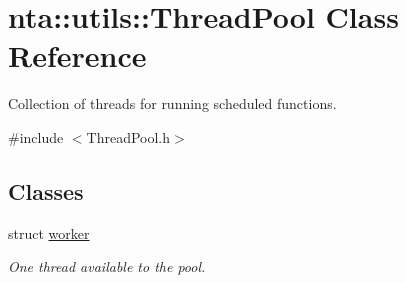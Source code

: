 \hypertarget{classnta_1_1utils_1_1ThreadPool}{}\section{nta\+:\+:utils\+:\+:Thread\+Pool Class Reference}
\label{classnta_1_1utils_1_1ThreadPool}


Collection of threads for running scheduled functions.  




{\ttfamily \#include $<$Thread\+Pool.\+h$>$}

\subsection*{Classes}
\begin{DoxyCompactItemize}
\item 
struct \hyperlink{structnta_1_1utils_1_1ThreadPool_1_1worker}{worker}
\begin{DoxyCompactList}\small\item\em One thread available to the pool. \end{DoxyCompactList}\end{DoxyCompactItemize}
